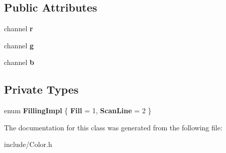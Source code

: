 \subsection*{Public Attributes}
\begin{DoxyCompactItemize}
\item 
\mbox{\label{classtiara_1_1Color_aebe87e3ed9ebd1d9cabc392cf15b1300}} 
channel {\bfseries r}
\item 
\mbox{\label{classtiara_1_1Color_a00cd31813d8177b21025a3110b04b5d3}} 
channel {\bfseries g}
\item 
\mbox{\label{classtiara_1_1Color_a2587963d8cddfa876072780f635b3ed4}} 
channel {\bfseries b}
\end{DoxyCompactItemize}
\subsection*{Private Types}
\begin{DoxyCompactItemize}
\item 
\mbox{\label{classtiara_1_1Color_a5bb5fb995bf5ccbd6d59f188a504c0c8}} 
enum {\bfseries Filling\+Impl} \{ {\bfseries Fill} = 1, 
{\bfseries Scan\+Line} = 2
 \}
\end{DoxyCompactItemize}


The documentation for this class was generated from the following file\+:\begin{DoxyCompactItemize}
\item 
include/Color.\+h\end{DoxyCompactItemize}
